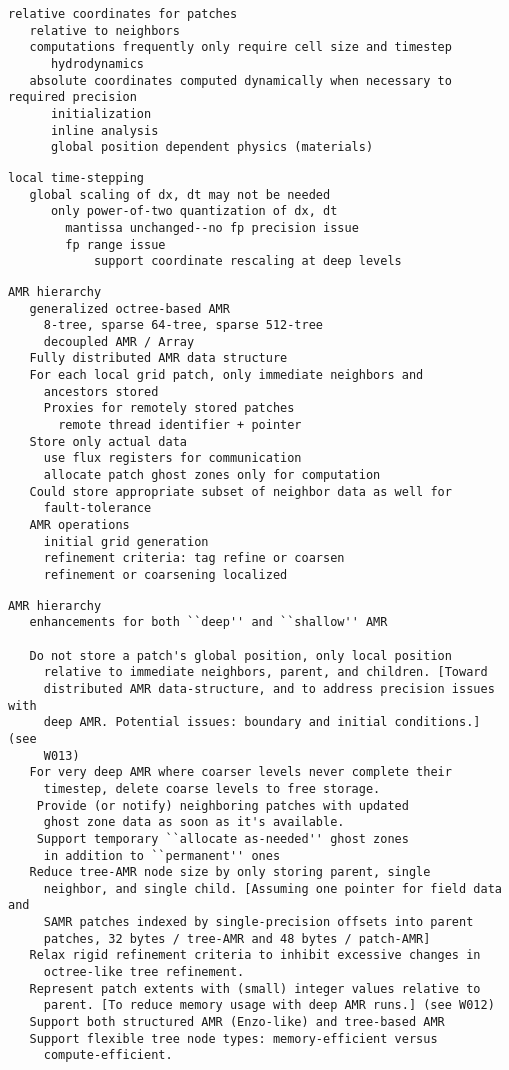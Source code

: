\documentclass{article}
\begin{document}
\begin{verbatim}
relative coordinates for patches   
   relative to neighbors
   computations frequently only require cell size and timestep
      hydrodynamics
   absolute coordinates computed dynamically when necessary to required precision
      initialization
      inline analysis
      global position dependent physics (materials)
\end{verbatim}

\begin{verbatim}
local time-stepping
   global scaling of dx, dt may not be needed
      only power-of-two quantization of dx, dt
        mantissa unchanged--no fp precision issue
        fp range issue
            support coordinate rescaling at deep levels
\end{verbatim}

\begin{verbatim}
AMR hierarchy
   generalized octree-based AMR 
     8-tree, sparse 64-tree, sparse 512-tree
     decoupled AMR / Array
   Fully distributed AMR data structure
   For each local grid patch, only immediate neighbors and
     ancestors stored
     Proxies for remotely stored patches
       remote thread identifier + pointer
   Store only actual data
     use flux registers for communication
     allocate patch ghost zones only for computation
   Could store appropriate subset of neighbor data as well for
     fault-tolerance
   AMR operations
     initial grid generation
     refinement criteria: tag refine or coarsen
     refinement or coarsening localized
\end{verbatim}

\begin{verbatim}
AMR hierarchy
   enhancements for both ``deep'' and ``shallow'' AMR

   Do not store a patch's global position, only local position
     relative to immediate neighbors, parent, and children. [Toward
     distributed AMR data-structure, and to address precision issues with
     deep AMR. Potential issues: boundary and initial conditions.] (see
     W013)
   For very deep AMR where coarser levels never complete their
     timestep, delete coarse levels to free storage.
    Provide (or notify) neighboring patches with updated
     ghost zone data as soon as it's available.
    Support temporary ``allocate as-needed'' ghost zones
     in addition to ``permanent'' ones
   Reduce tree-AMR node size by only storing parent, single
     neighbor, and single child. [Assuming one pointer for field data and
     SAMR patches indexed by single-precision offsets into parent
     patches, 32 bytes / tree-AMR and 48 bytes / patch-AMR]
   Relax rigid refinement criteria to inhibit excessive changes in
     octree-like tree refinement.
   Represent patch extents with (small) integer values relative to
     parent. [To reduce memory usage with deep AMR runs.] (see W012)
   Support both structured AMR (Enzo-like) and tree-based AMR
   Support flexible tree node types: memory-efficient versus
     compute-efficient.
\end{verbatim}
\end{document}
